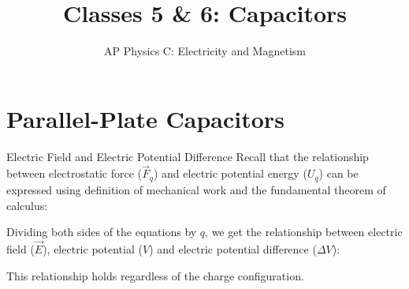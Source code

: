 \documentclass[12pt,aspectratio=169]{beamer}
\title{Classes 5 \& 6: Capacitors}
\subtitle{AP Physics C: Electricity and Magnetism}
\begin{document}
\begin{frame}
  \maketitle
\end{frame}


\section{Parallel-Plate Capacitors}

\begin{frame}{Electric Field and Electric Potential Difference}
  Recall that the relationship between electrostatic force ($\vec F_q$) and
  electric potential energy ($U_q$) can be expressed using definition of
  mechanical work and the fundamental theorem of calculus:


  Dividing both sides of the equations by $q$, we get the relationship between
  electric field ($\vec E$), electric potential ($V$) and electric potential
  difference ($\Delta V$):
  

  This relationship holds regardless of the charge configuration.
\end{frame}
\end{document}
